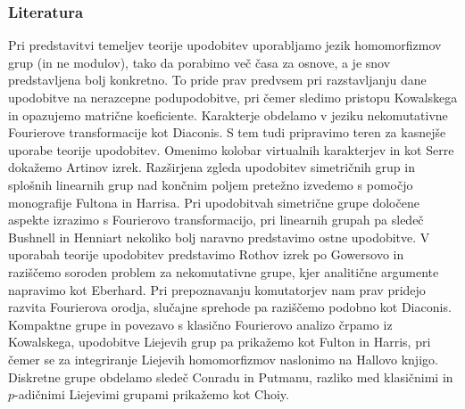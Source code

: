 \documentclass[11pt]{book}
\theoremstyle{definition}
\theoremstyle{zgled}
\theoremstyle{zgledbrezstevilke}
\theoremstyle{odprtproblem}
\theoremstyle{domacanaloga}
\theoremstyle{izrek}
\begin{document}
\newpage

\subsubsection{Literatura}

Pri predstavitvi temeljev teorije upodobitev uporabljamo jezik homomorfizmov grup (in ne modulov), tako da porabimo več časa za osnove, a je snov predstavljena bolj konkretno. To pride prav predvsem pri razstavljanju dane upodobitve na nerazcepne podupodobitve, pri čemer sledimo pristopu Kowalskega in opazujemo matrične koeficiente. Karakterje obdelamo v jeziku nekomutativne Fourierove transformacije kot Diaconis. S tem tudi pripravimo teren za kasnejše uporabe teorije upodobitev. Omenimo kolobar virtualnih karakterjev in kot Serre dokažemo Artinov izrek. Razširjena zgleda upodobitev simetričnih grup in splošnih linearnih grup nad končnim poljem pretežno izvedemo s pomočjo monografije Fultona in Harrisa. Pri upodobitvah simetrične grupe določene aspekte izrazimo s Fourierovo transformacijo, pri linearnih grupah pa sledeč Bushnell in Henniart nekoliko bolj naravno predstavimo ostne upodobitve. V uporabah teorije upodobitev predstavimo Rothov izrek po Gowersovo in raziščemo soroden problem za nekomutativne grupe, kjer analitične argumente napravimo kot Eberhard. Pri prepoznavanju komutatorjev nam prav pridejo razvita Fourierova orodja, slučajne sprehode pa raziščemo podobno kot Diaconis. Kompaktne grupe in povezavo s klasično Fourierovo analizo črpamo iz Kowalskega, upodobitve Liejevih grup pa prikažemo kot Fulton in Harris, pri čemer se za integriranje Liejevih homomorfizmov naslonimo na Hallovo knjigo. Diskretne grupe obdelamo sledeč Conradu in Putmanu, razliko med klasičnimi in $p$-adičnimi Liejevimi grupami prikažemo kot Choiy.
\end{document}
